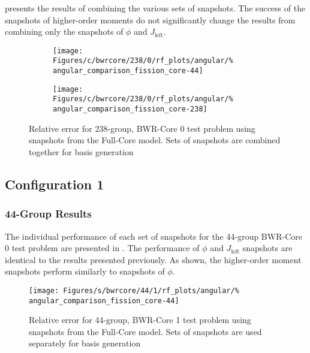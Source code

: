  presents the results of combining the 
various sets of snapshots.  The success of the snapshots of higher-order 
moments do not significantly change the results from combining only the 
snapshots of $\phi$ and $J_{\text{left}}$.

\begin{figure*}[tb]
    \centering
    \begin{subfigure}{0.5\textwidth}
        \centering
        \texttt{[image: Figures/c/bwrcore/238/0/rf\_plots/angular/\%
            angular\_comparison\_fission\_core-44]}
    \end{subfigure}%
    \begin{subfigure}{0.5\textwidth}
        \centering
        \texttt{[image: Figures/c/bwrcore/238/0/rf\_plots/angular/\%
            angular\_comparison\_fission\_core-238]}
    \end{subfigure}
    \caption{Relative error for 238-group, BWR-Core 0 test problem using 
        snapshots from the Full-Core model.  Sets of snapshots are combined 
        together for basis generation}
    \label{fig:BWR0-core-combined-238}
\end{figure*}

\subsection{Configuration 1}

\subsubsection{44-Group Results}

The individual performance of each set of snapshots for the 44-group BWR-Core 0
test problem are presented in .  The 
performance of $\phi$ and $J_{\text{left}}$ snapshots are 
identical to the results presented previously.  As shown, the higher-order 
moment snapshots perform similarly to snapshots of $\phi$.

\begin{figure*}[tb]
    \centering
    \texttt{[image: Figures/s/bwrcore/44/1/rf\_plots/angular/\%
        angular\_comparison\_fission\_core-44]}
    \caption{Relative error for 44-group, BWR-Core 1 test problem using 
        snapshots from the Full-Core model.  Sets of snapshots are 
        used separately for basis generation}
    \label{fig:BWR1-core-single}
\end{figure*}

